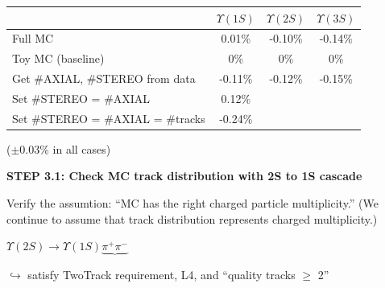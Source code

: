 \documentclass[landscape]{article}
\begin{document}
\vfill

\begin{center}
  \renewcommand{\arraystretch}{1.25}
  \begin{tabular}{p{12 cm} c c c}
  & \mbox{\hspace{0.5 cm}} $\Upsilon(1S)$ \mbox{\hspace{0.5 cm}} & \mbox{\hspace{0.5 cm}} $\Upsilon(2S)$ \mbox{\hspace{0.5 cm}} & \mbox{\hspace{0.5 cm}} $\Upsilon(3S)$ \mbox{\hspace{0.5 cm}} \\\hline
  Full MC & 0.01\% & -0.10\% & -0.14\% \\
  Toy MC (baseline) & 0\% & 0\% & 0\% \\
  Get \#AXIAL, \#STEREO from data & -0.11\% & -0.12\% & -0.15\% \\
  Set \#STEREO = \#AXIAL & 0.12\% & & \\
  Set \#STEREO = \#AXIAL = \#tracks & -0.24\% & & \\
  \end{tabular}
\end{center}
\begin{flushright} ($\pm$0.03\% in all cases) \end{flushright}

\vfill

\pagebreak

\vspace{1 cm}

{\bf STEP 3.1: Check MC track distribution with 2S to 1S cascade}

\vfill

Verify the assumtion: ``MC has the right charged particle
multiplicity.''  (We continue to assume that track distribution
represents charged multiplicity.)

\vfill

$\Upsilon(2S) \to \Upsilon(1S) \underbrace{\pi^+\pi^-}$

\hspace{5.5 cm} $\hookrightarrow$ satisfy TwoTrack requirement, L4, and ``quality tracks $\ge$ 2''
\end{document}
